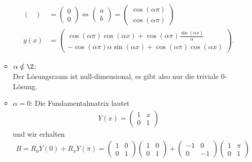 \begin{solution}
\begin{enumerate}[label = \textbf{\alph*)}]
\begin{itemize}
\begin{align*}
\begin{pmatrix}
        \end{pmatrix}
        &= \begin{pmatrix}
          0 \\ 0
        \end{pmatrix} \iff
        \begin{pmatrix}
          a \\ b
        \end{pmatrix}
        = \begin{pmatrix}
          \cos(\alpha \pi) \\ \cos(\alpha \pi)
        \end{pmatrix}\\
        y(x) &=
        \begin{pmatrix}
          \cos(\alpha \pi)\cos(\alpha x) + \cos(\alpha \pi)\frac{\sin(\alpha x)}{\alpha} \\
          -\cos(\alpha \pi)\alpha\sin(\alpha x) + \cos(\alpha \pi)\cos(\alpha x)
        \end{pmatrix}.
      \end{align*}
    \item $\alpha \notin \Z$: \\
      Der Lösungsraum ist null-dimensional, es gibt also nur die triviale $0$-Lösung.
    \item $\alpha = 0$:
      Die Fundamentalmatrix lautet
      \begin{align*}
        Y(x) = \begin{pmatrix}
          1 & x \\ 0 & 1
        \end{pmatrix}
      \end{align*}
      und wir erhalten
      \begin{align*}
        B = R_0Y(0) + R_{\pi}Y(\pi) =
        \begin{pmatrix}
          1 & 0 \\ 0 & 1
        \end{pmatrix}
        \begin{pmatrix}
          1 & 0  \\ 0 & 1
        \end{pmatrix}
        + \begin{pmatrix}
          -1 & 0 \\ 0 & -1
        \end{pmatrix}
        \begin{pmatrix}
          1 & \pi  \\ 0 & 1
        \end{pmatrix}

\end{align*}
\end{itemize}
\end{enumerate}
\end{solution}

